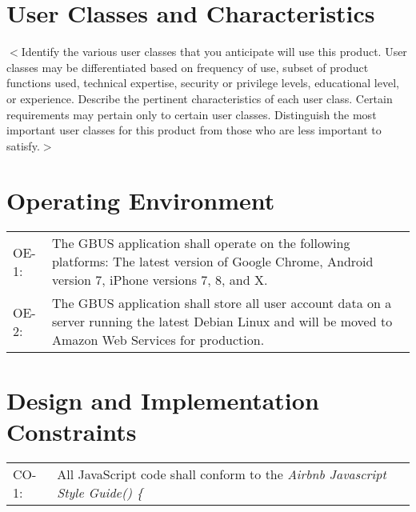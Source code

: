 \documentclass{scrreprt}
\begin{document}
\section{User Classes and Characteristics}
$<$Identify the various user classes that you anticipate will use this product.
User classes may be differentiated based on frequency of use, subset of product
functions used, technical expertise, security or privilege levels, educational
level, or experience. Describe the pertinent characteristics of each user class.
Certain requirements may pertain only to certain user classes. Distinguish the
most important user classes for this product from those who are less important
to satisfy.$>$

\section{Operating Environment}
\begin{center}
\begin{longtable}{ p{1cm} p{14cm} }
OE-1: & The GBUS application shall operate on the following platforms: The latest version of Google Chrome, Android version 7, iPhone versions 7, 8, and X. \\
OE-2: & The GBUS application shall store all user account data on a server running the latest Debian Linux and will be moved to Amazon Web Services for production. \\
\end{longtable}
\end{center}

\section{Design and Implementation Constraints}
\begin{center}
\begin{longtable}{ p{2cm} p{13cm} }
CO-1: & All JavaScript code shall conform to the \textit{Airbnb Javascript Style Guide() \{} \\
\end{longtable}
\end{center}
\end{document}
